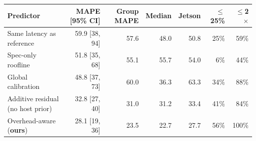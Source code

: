 \begin{tabular}{lrrrrrr}
\toprule
Predictor & MAPE [95\% CI] & Group MAPE & Median & Jetson & $\le$25\% & $\le$2$\times$ \\
\midrule
Same latency as reference & 59.9 [38, 94] & 57.6 & 48.0 & 50.8 & 25\% & 59\% \\
Spec-only roofline & 51.8 [35, 68] & 55.1 & 55.7 & 54.0 & 6\% & 44\% \\
Global calibration & 48.8 [37, 73] & 60.0 & 36.3 & 63.3 & 34\% & 88\% \\
Additive residual (no host prior) & 32.8 [27, 40] & 31.0 & 31.2 & 33.4 & 41\% & 84\% \\
Overhead-aware (\textbf{ours}) & 28.1 [19, 36] & 23.5 & 22.7 & 27.7 & 56\% & 100\% \\
\bottomrule
\end{tabular}
